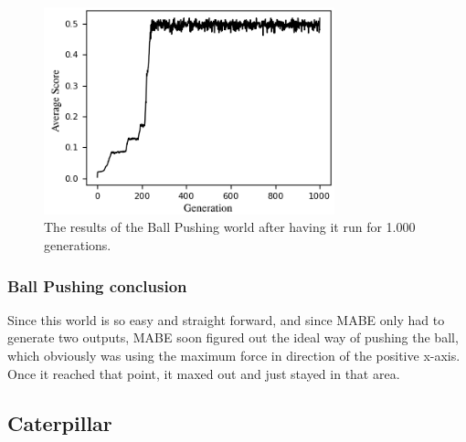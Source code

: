 \documentclass[12pt,oneside,listof=totoc,paper=a4,headings=small]{scrbook}
\begin{document}
\begin{figure}[h!]
\centering
\includegraphics[width=0.75\textwidth,height=0.75\textheight,keepaspectratio]{images/ballgraph.png}
\caption{The results of the Ball Pushing world after having it run for 1.000 generations.}
\label{fig:ballgraph}
\end{figure}

\subsubsection{Ball Pushing conclusion}
Since this world is so easy and straight forward, and since MABE only had to generate two outputs, MABE soon figured out the ideal way of pushing the ball, which obviously was using the maximum force in direction of the positive x-axis. Once it reached that point, it maxed out and just stayed in that area.

\newpage

\subsection{Caterpillar}
\end{document}
